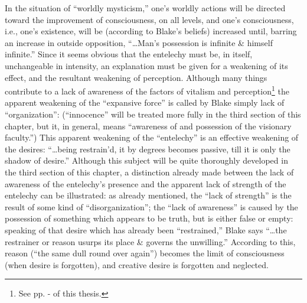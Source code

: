 In the situation of \enquote{worldly mysticism,} one's worldly actions will be directed toward the improvement of consciousness, on all levels, and
one's consciousness, i.e., one's existence, will be (according to Blake's beliefs) increased until, barring an increase in outside opposition, \enquote{\dots Man's
possession is infinite \& himself infinite.}\supercite{keynes:william-blake}
Since it seems obvious that the entelechy must be, in itself, unchangeable
in intensity, an explanation must be given for a weakening of its effect, and the resultant weakening of perception. Although
many things contribute to a lack of awareness of the factors of vitalism and perception\footnote{See pp. \pageref{self:28}-\pageref{self:22} of this thesis.}
the apparent weakening of the \enquote{expansive force} is called
by Blake simply lack of \enquote{organization}: (\enquote{innocence} will be treated more fully
in the third section of this chapter, but it, in general, means \enquote{awareness of and possession of the visionary faculty.})
This apparent weakening of the \enquote{entelechy} is an effective weakening of the desires: \enquote{\dots being restrain'd, it by degrees becomes passive, till it is only the shadow of desire.}\supercite{keynes:william-blake}
Although this subject will be quite thoroughly developed in the third section of this chapter, a distinction already made between the lack
of awareness of the entelechy's presence and the apparent lack of strength of the entelechy
can be illustrated: as already mentioned, the \enquote{lack of strength} is the result of some kind of \enquote{disorganization}; the \enquote{lack of awareness} is
caused by the possession of something which appears to be truth, but is either false or empty: speaking of that desire which has already been \enquote{restrained,} Blake
says \enquote{\dots the restrainer or reason usurps its place \& governs the unwilling.}\supercite{keynes:william-blake}
According to this, reason (\enquote{the same dull round over again}) becomes the limit of consciousness
(when desire is forgotten), and creative desire is forgotten and neglected.

\label{self:28}


